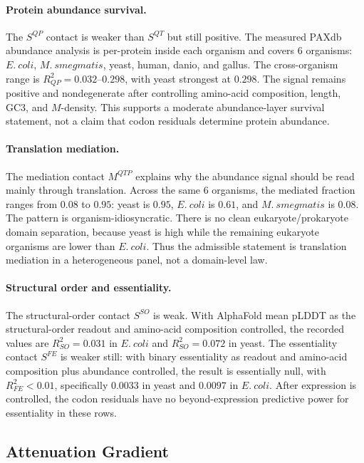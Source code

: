 \paragraph{Protein abundance survival.}
The $S^{QP}$ contact is weaker than $S^{QT}$ but still positive.  The measured PAXdb abundance analysis is per-protein inside each organism and covers $6$ organisms: $E.\ coli$, $M.\ smegmatis$, yeast, human, danio, and gallus.  The cross-organism range is $R^2_{QP}=0.032$--$0.298$, with yeast strongest at $0.298$.  The signal remains positive and nondegenerate after controlling amino-acid composition, length, GC3, and $M$-density.  This supports a moderate abundance-layer survival statement, not a claim that codon residuals determine protein abundance.

\paragraph{Translation mediation.}
The mediation contact $M^{QTP}$ explains why the abundance signal should be read mainly through translation.  Across the same $6$ organisms, the mediated fraction ranges from $0.08$ to $0.95$: yeast is $0.95$, $E.\ coli$ is $0.61$, and $M.\ smegmatis$ is $0.08$.  The pattern is organism-idiosyncratic.  There is no clean eukaryote/prokaryote domain separation, because yeast is high while the remaining eukaryote organisms are lower than $E.\ coli$.  Thus the admissible statement is translation mediation in a heterogeneous panel, not a domain-level law.

\paragraph{Structural order and essentiality.}
The structural-order contact $S^{SO}$ is weak.  With AlphaFold mean pLDDT as the structural-order readout and amino-acid composition controlled, the recorded values are $R^2_{SO}=0.031$ in $E.\ coli$ and $R^2_{SO}=0.072$ in yeast.  The essentiality contact $S^{FE}$ is weaker still: with binary essentiality as readout and amino-acid composition plus abundance controlled, the result is essentially null, with $R^2_{FE}<0.01$, specifically $0.0033$ in yeast and $0.0097$ in $E.\ coli$.  After expression is controlled, the codon residuals have no beyond-expression predictive power for essentiality in these rows.

\subsection{Attenuation Gradient}

